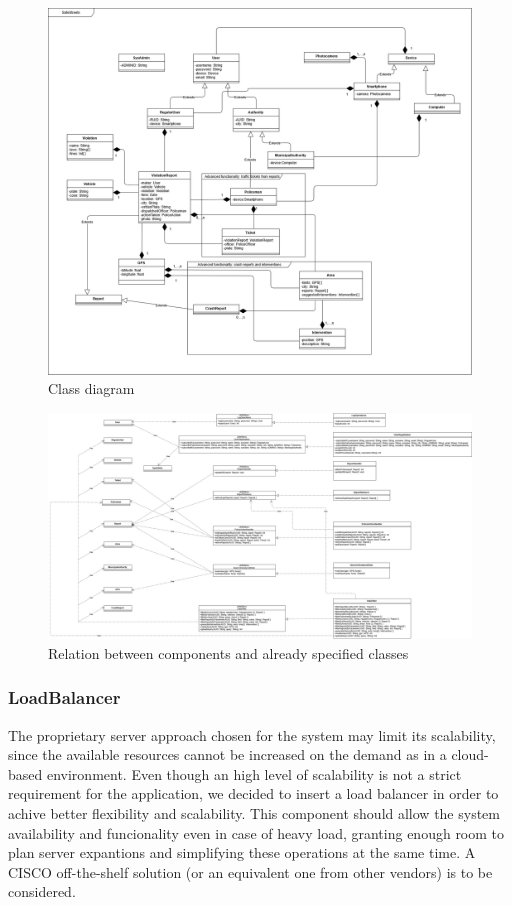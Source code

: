 \begin{figure}[H]
	\centering
	\includegraphics[angle=90, scale=0.30]{Images/ADV_class_diagram}
	\caption{Class diagram}
\end{figure}
\newpage

\begin{figure}[H]
	\centering
	\includegraphics[angle=90, scale=0.25]{Images/component_class_relation}
	\caption{Relation between components and already specified classes}
\end{figure}
\newpage

\subsubsection{LoadBalancer}
The proprietary server approach chosen for the system may limit its scalability, since the available resources cannot be increased on the demand as in a cloud-based environment. Even though an high level of scalability is not a strict requirement for the application, we decided to insert a load balancer in order to achive better flexibility and scalability. This component should allow the system availability and funcionality even in case of heavy load, granting enough room to plan server expantions and simplifying these operations at the same time. \newline
A CISCO off-the-shelf solution (or an equivalent one from other vendors) is to be considered.


